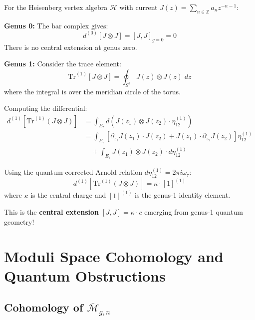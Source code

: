 \begin{example}
\label{ex:heisenberg-genus-1}
For the Heisenberg vertex algebra $\mathcal{H}$ with current $J(z) = \sum_{n \in \mathbb{Z}} a_n z^{-n-1}$:

\textbf{Genus 0:} The bar complex gives:
\begin{equation}
d^{(0)}[J \otimes J] = [J, J]_{g=0} = 0
\end{equation}
There is no central extension at genus zero.

\textbf{Genus 1:} Consider the trace element:
\begin{equation}
\text{Tr}^{(1)}[J \otimes J] = \oint_{S^1} J(z) \otimes J(z) \; dz
\end{equation}
where the integral is over the meridian circle of the torus.

Computing the differential:
\begin{align}
d^{(1)}[\text{Tr}^{(1)}(J \otimes J)] &= \int_{E_\tau} d\left(J(z_1) \otimes J(z_2) \cdot \eta_{12}^{(1)}\right)\\
&= \int_{E_\tau} \left[\partial_{z_1} J(z_1) \cdot J(z_2) + J(z_1) \cdot \partial_{z_2} J(z_2)\right] \eta_{12}^{(1)}\\
&\quad + \int_{E_\tau} J(z_1) \otimes J(z_2) \cdot d\eta_{12}^{(1)}
\end{align}

Using the quantum-corrected Arnold relation $d\eta_{12}^{(1)} = 2\pi i \omega_\tau$:
\begin{equation}
d^{(1)}[\text{Tr}^{(1)}(J \otimes J)] = \kappa \cdot [1]^{(1)}
\end{equation}
where $\kappa$ is the central charge and $[1]^{(1)}$ is the genus-1 identity element.

This is the \textbf{central extension} $[J, J] = \kappa \cdot c$ emerging from genus-1 quantum geometry!
\end{example}


\section{Moduli Space Cohomology and Quantum Obstructions}
\label{sec:moduli-cohomology-quantum}

\subsection{Cohomology of $\overline{\mathcal{M}}_{g,n}$}

